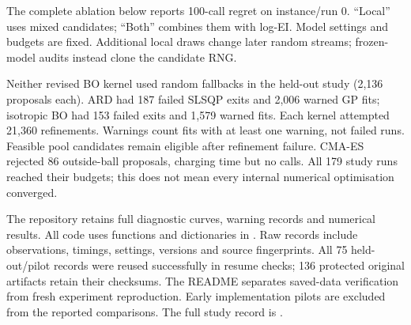\documentclass[12pt]{article}
\begin{document}
The complete ablation below reports 100-call regret on instance/run 0.
``Local'' uses mixed candidates; ``Both'' combines them with log-EI.
Model settings and budgets are fixed. Additional local draws change later
random streams; frozen-model audits instead clone the candidate RNG.
\begin{center}
\small
{}
\end{center}

Neither revised BO kernel used random fallbacks in the held-out study
(2,136 proposals each). ARD had 187 failed SLSQP exits and 2,006 warned GP
fits; isotropic BO had 153 failed exits and 1,579 warned fits. Each kernel
attempted 21,360 refinements. Warnings count fits with at least one warning,
not failed runs. Feasible pool candidates remain eligible after refinement
failure. CMA-ES rejected 86 outside-ball proposals, charging time but no calls.
All 179 study runs reached their budgets; this does not mean every internal
numerical optimisation converged.

The repository retains full diagnostic curves, warning records and numerical
results. All code uses functions and dictionaries in
. Raw records include observations, timings,
settings, versions and source fingerprints. All 75 held-out/pilot records were
reused successfully in resume checks; 136 protected original artifacts retain
their checksums. The README separates saved-data verification from fresh
experiment reproduction. Early implementation pilots are excluded from the
reported comparisons. The full study record is .
\end{document}
